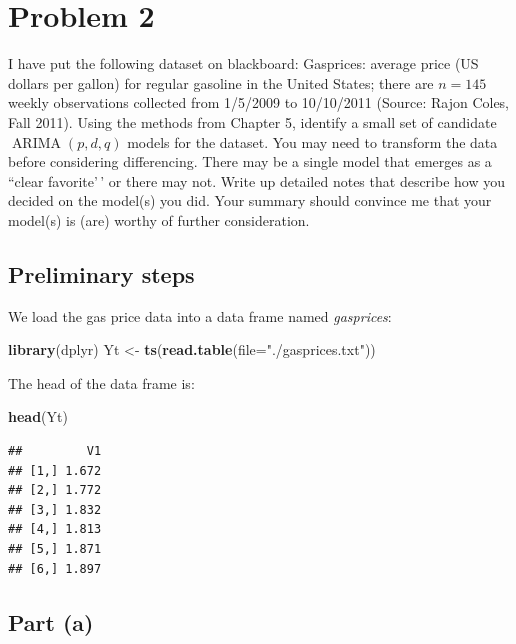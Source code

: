 \documentclass[
]{article}
\newenvironment{Shaded}{\begin{snugshade}}{\end{snugshade}}
\newcommand{\AttributeTok}[1]{\textcolor[rgb]{0.13,0.29,0.53}{#1}}
\newcommand{\FunctionTok}[1]{\textcolor[rgb]{0.13,0.29,0.53}{\textbf{#1}}}
\newcommand{\NormalTok}[1]{#1}
\newcommand{\OtherTok}[1]{\textcolor[rgb]{0.56,0.35,0.01}{#1}}
\newcommand{\StringTok}[1]{\textcolor[rgb]{0.31,0.60,0.02}{#1}}
\begin{document}
\hypertarget{problem-2}{%
\section{Problem 2}\label{problem-2}}

I have put the following dataset on blackboard: Gasprices: average price
(US dollars per gallon) for regular gasoline in the United States; there
are \(n = 145\) weekly observations collected from 1/5/2009 to
10/10/2011 (Source: Rajon Coles, Fall 2011). Using the methods from
Chapter 5, identify a small set of candidate
\(\operatorname{ARIMA}(p, d, q)\) models for the dataset. You may need
to transform the data before considering differencing. There may be a
single model that emerges as a ``clear favorite'\,' or there may not.
Write up detailed notes that describe how you decided on the model(s)
you did. Your summary should convince me that your model(s) is (are)
worthy of further consideration.

\hypertarget{preliminary-steps}{%
\subsection{Preliminary steps}\label{preliminary-steps}}

We load the gas price data into a data frame named \emph{gasprices}:

\begin{Shaded}
\begin{Highlighting}[]
\FunctionTok{library}\NormalTok{(dplyr)}
\NormalTok{Yt }\OtherTok{\textless{}{-}} \FunctionTok{ts}\NormalTok{(}\FunctionTok{read.table}\NormalTok{(}\AttributeTok{file=}\StringTok{"./gasprices.txt"}\NormalTok{))}
\end{Highlighting}
\end{Shaded}

The head of the data frame is:

\begin{Shaded}
\begin{Highlighting}[]
\FunctionTok{head}\NormalTok{(Yt)}
\end{Highlighting}
\end{Shaded}

\begin{verbatim}
##         V1
## [1,] 1.672
## [2,] 1.772
## [3,] 1.832
## [4,] 1.813
## [5,] 1.871
## [6,] 1.897
\end{verbatim}

\hypertarget{part-a-1}{%
\subsection{Part (a)}\label{part-a-1}}
\end{document}
